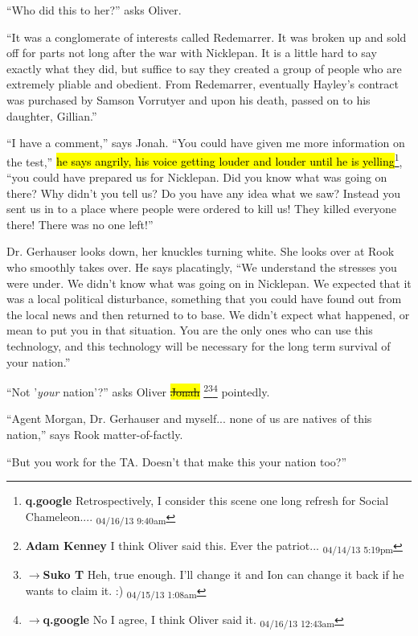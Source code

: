 ``Who did this to her?'' asks Oliver.

``It was a conglomerate of interests called Redemarrer.  It was broken up and sold off for parts not long after the war with Nicklepan.  It is a little hard to say exactly what they did, but suffice to say they created a group of people who are extremely pliable and obedient.  From Redemarrer, eventually Hayley's contract was purchased by Samson Vorrutyer and upon his death, passed on to his daughter, Gillian.''



``I have a comment,'' says Jonah.  ``You could have given me more information on the test,'' \hl{he says angrily, his voice getting louder and louder until he is yelling}\footnote{\textbf{q.google }Retrospectively, I consider this scene one long refresh for Social Chameleon.... \textsubscript{04/16/13 9:40am}}, ``you could have prepared us for Nicklepan.  Did you know what was going on there?  Why didn't you tell us?  Do you have any idea what we saw?  Instead you sent us in to a place where people were ordered to kill us!  They killed everyone there!  There was no one left!''



Dr. Gerhauser looks down, her knuckles turning white.  She looks over at Rook who smoothly takes over.  He says placatingly, ``We understand the stresses you were under.  We didn't know what was going on in Nicklepan.  We expected that it was a local political disturbance, something that you could have found out from the local news and then returned to to base.  We didn't expect what happened, or mean to put you in that situation.  You are the only ones who can use this technology, and this technology will be necessary for the long term survival of your nation.''

``Not '\textit{your} nation'?'' asks Oliver \sout{ \hl{Jonah} }\footnote{\textbf{Adam Kenney }I think Oliver said this. Ever the patriot... \textsubscript{04/14/13 5:19pm}}\footnote{$\rightarrow$\textbf{Suko T }Heh, true enough. I'll change it and Ion can change it back if he wants to claim it. :) \textsubscript{04/15/13 1:08am}}\footnote{$\rightarrow$\textbf{q.google }No I agree, I think Oliver said it. \textsubscript{04/16/13 12:43am}} pointedly.

``Agent Morgan, Dr. Gerhauser and myself... none of us are natives of this nation,'' says Rook matter-of-factly.

``But you work for the TA.  Doesn't that make this your nation too?''


